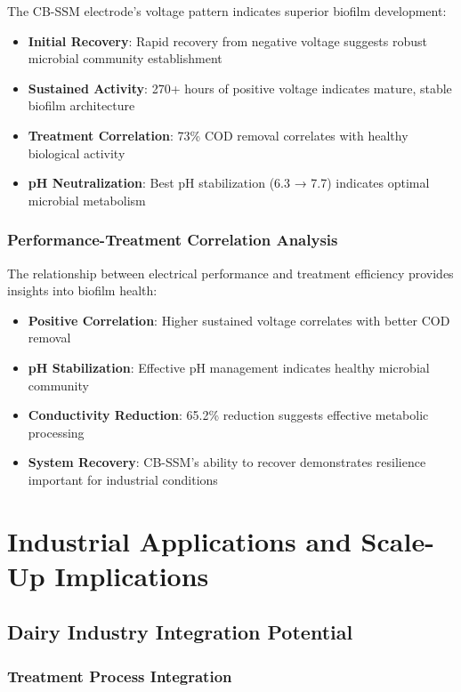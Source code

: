 \documentclass[12pt,a4paper]{article}
\begin{document}
The CB-SSM electrode's voltage pattern indicates superior biofilm development:

\begin{itemize}
    \item \textbf{Initial Recovery}: Rapid recovery from negative voltage suggests robust microbial community establishment
    \item \textbf{Sustained Activity}: 270+ hours of positive voltage indicates mature, stable biofilm architecture
    \item \textbf{Treatment Correlation}: 73\% COD removal correlates with healthy biological activity
    \item \textbf{pH Neutralization}: Best pH stabilization (6.3 → 7.7) indicates optimal microbial metabolism
\end{itemize}

\subsubsection{Performance-Treatment Correlation Analysis}

The relationship between electrical performance and treatment efficiency provides insights into biofilm health:

\begin{itemize}
    \item \textbf{Positive Correlation}: Higher sustained voltage correlates with better COD removal
    \item \textbf{pH Stabilization}: Effective pH management indicates healthy microbial community
    \item \textbf{Conductivity Reduction}: 65.2\% reduction suggests effective metabolic processing
    \item \textbf{System Recovery}: CB-SSM's ability to recover demonstrates resilience important for industrial conditions
\end{itemize}

\section{Industrial Applications and Scale-Up Implications}

\subsection{Dairy Industry Integration Potential}

\subsubsection{Treatment Process Integration}
\end{document}
